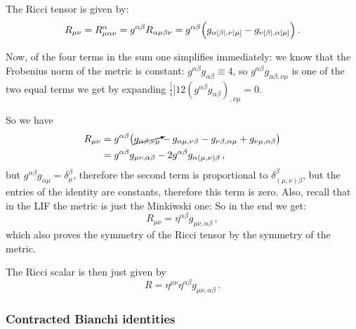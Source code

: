 \documentclass[main.tex]{subfiles}
\begin{document}
The Ricci tensor is given by: 
%
\begin{equation}
  R_{\mu \nu } = R^{\alpha }_{\mu \alpha \nu } 
  = g^{\alpha \beta }R_{\alpha \mu \beta \nu }
  = g^{\alpha \beta }\qty(g_{\alpha [\beta |, \nu | \mu ]} - g_{\nu  [\beta |, \alpha  | \mu ]})
\,.
\end{equation}
%

Now, of the four terms in the sum one simplifies immediately: we know that the Frobenius norm of the metric is constant: \(g^{\alpha \beta }g_{\alpha \beta } \equiv 4\), so \(g^{\alpha \beta }g_{\alpha \beta , \nu \mu }\) is one of the two equal terms we get by expanding \(\frac[i]{1}{2} (g^{\alpha \beta }g_{\alpha \beta })_{,\nu \mu } = 0\).

So we have 
%
\begin{subequations}
    \begin{align}
    R_{\mu \nu }
    &= g^{\alpha \beta }\qty(
        \cancelto{}{g_{\alpha \beta , \nu \mu }}
        - g_{\alpha \mu  , \nu \beta  }
        - g_{\nu  \beta , \alpha  \mu }
        + g_{\nu  \mu  , \alpha  \beta }      
        )  \\
    &= g^{\alpha \beta }g_{\mu \nu, \alpha \beta }
    - 2 g^{\alpha \beta } g_{\alpha (\mu, \nu) \beta }
\,,
\end{align}
\end{subequations}
%
but \(g^{\alpha \beta }g_{\alpha \mu } = \delta^{\beta }_{\mu }\), therefore the second term is proportional to \(\delta^{\beta }_{(\mu, \nu ) \beta }\), but the entries of the identity are constants, therefore this term is zero.
Also, recall that in the LIF the metric is just the Minkiwski one:
So in the end we get: 
%
\begin{equation}
  R_{\mu \nu } = \eta^{\alpha \beta }g_{\mu \nu, \alpha \beta   }
\,,
\end{equation}
%
which also proves the symmetry of the Ricci tensor by the symmetry of the metric.

The Ricci scalar is then just given by 
%
\begin{equation}
  R = \eta ^{\mu \nu }\eta ^{\alpha \beta }g_{\mu \nu , \alpha \beta }
\,.
\end{equation}

\subsubsection{Contracted Bianchi identities}
\end{document}
